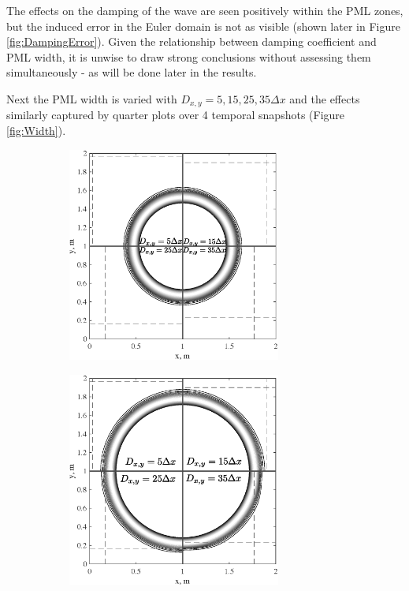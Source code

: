 The effects on the damping of the wave are seen positively within the PML zones, but the induced error in the Euler domain is not as visible (shown later in Figure \ref{fig:DampingError}). Given the relationship between damping coefficient and PML width, it is unwise to draw strong conclusions without assessing them simultaneously - as will be done later in the results.

\clearpage

Next the PML width is varied with $D_{x,y} = 5, 15, 25, 35 \Delta x$ and the effects similarly captured by quarter plots over 4 temporal snapshots (Figure \ref{fig:Width}).


\begin{figure}[h!]
        \centering
        \begin{subfigure}[b]{0.475\textwidth}
            \centering
            \includegraphics[width=7cm]{Figures/TechnicalAchievement/Res/Width05s.eps}
            \caption{}    
            \label{fig:Width05}
        \end{subfigure}
        \hfill
        \begin{subfigure}[b]{0.475\textwidth}  
            \centering 
            \includegraphics[width=7cm]{Figures/TechnicalAchievement/Res/Width075s.eps}

\end{subfigure}
\end{figure}
